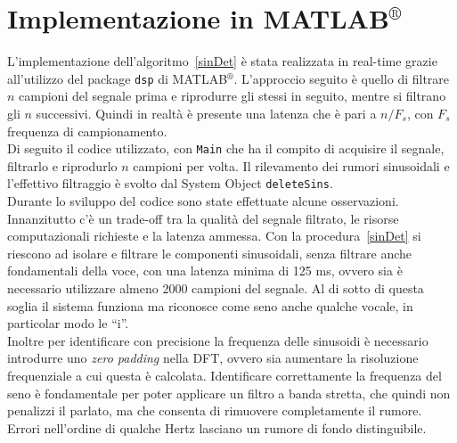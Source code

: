 \documentclass[10pt,A4]{article}
\begin{document}
\clearpage

\section{Implementazione in MATLAB$^{\circledR}$}
L'implementazione dell'algoritmo~\ref{sinDet} è stata realizzata in real-time grazie all'utilizzo del package \texttt{dsp} di MATLAB$^{\circledR}$. L'approccio seguito è quello di filtrare $n$ campioni del segnale prima e riprodurre gli stessi in seguito, mentre si filtrano gli $n$ successivi. Quindi in realtà è presente una latenza che è pari a $n/F_s$, con $F_s$ frequenza di campionamento.\\
Di seguito il codice utilizzato, con \texttt{Main} che ha il compito di acquisire il segnale, filtrarlo e riprodurlo $n$ campioni per volta. Il rilevamento dei rumori sinusoidali e l'effettivo filtraggio è svolto dal System Object \texttt{deleteSins}.\\
Durante lo sviluppo del codice sono state effettuate alcune osservazioni. Innanzitutto c'è un trade-off tra la qualità del segnale filtrato, le risorse computazionali richieste e la latenza ammessa. Con la procedura~\ref{sinDet} si riescono ad isolare e filtrare le componenti sinusoidali, senza filtrare anche fondamentali della voce, con una latenza minima di 125 ms, ovvero sia è necessario utilizzare almeno 2000 campioni del segnale. Al di sotto di questa soglia il sistema funziona ma riconosce come seno anche qualche vocale, in particolar modo le ``i''. \\
Inoltre per identificare con precisione la frequenza delle sinusoidi è necessario introdurre uno \textit{zero padding} nella DFT, ovvero sia aumentare la risoluzione frequenziale a cui questa è calcolata. Identificare correttamente la frequenza del seno è fondamentale per poter applicare un filtro a banda stretta, che quindi non penalizzi il parlato, ma che consenta di rimuovere completamente il rumore. Errori nell'ordine di qualche Hertz lasciano un rumore di fondo distinguibile.\\




\end{document}
